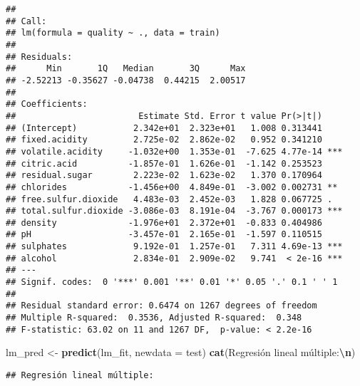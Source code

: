 \documentclass[
]{article}
\newenvironment{Shaded}{\begin{snugshade}}{\end{snugshade}}
\newcommand{\AttributeTok}[1]{\textcolor[rgb]{0.13,0.29,0.53}{#1}}
\newcommand{\DecValTok}[1]{\textcolor[rgb]{0.00,0.00,0.81}{#1}}
\newcommand{\FunctionTok}[1]{\textcolor[rgb]{0.13,0.29,0.53}{\textbf{#1}}}
\newcommand{\NormalTok}[1]{#1}
\newcommand{\OtherTok}[1]{\textcolor[rgb]{0.56,0.35,0.01}{#1}}
\newcommand{\SpecialCharTok}[1]{\textcolor[rgb]{0.81,0.36,0.00}{\textbf{#1}}}
\newcommand{\StringTok}[1]{\textcolor[rgb]{0.31,0.60,0.02}{#1}}
\begin{document}
\begin{verbatim}
## 
## Call:
## lm(formula = quality ~ ., data = train)
## 
## Residuals:
##      Min       1Q   Median       3Q      Max 
## -2.52213 -0.35627 -0.04738  0.44215  2.00517 
## 
## Coefficients:
##                        Estimate Std. Error t value Pr(>|t|)    
## (Intercept)           2.342e+01  2.323e+01   1.008 0.313441    
## fixed.acidity         2.725e-02  2.862e-02   0.952 0.341210    
## volatile.acidity     -1.032e+00  1.353e-01  -7.625 4.77e-14 ***
## citric.acid          -1.857e-01  1.626e-01  -1.142 0.253523    
## residual.sugar        2.223e-02  1.623e-02   1.370 0.170964    
## chlorides            -1.456e+00  4.849e-01  -3.002 0.002731 ** 
## free.sulfur.dioxide   4.483e-03  2.452e-03   1.828 0.067725 .  
## total.sulfur.dioxide -3.086e-03  8.191e-04  -3.767 0.000173 ***
## density              -1.976e+01  2.372e+01  -0.833 0.404986    
## pH                   -3.457e-01  2.165e-01  -1.597 0.110515    
## sulphates             9.192e-01  1.257e-01   7.311 4.69e-13 ***
## alcohol               2.834e-01  2.909e-02   9.741  < 2e-16 ***
## ---
## Signif. codes:  0 '***' 0.001 '**' 0.01 '*' 0.05 '.' 0.1 ' ' 1
## 
## Residual standard error: 0.6474 on 1267 degrees of freedom
## Multiple R-squared:  0.3536, Adjusted R-squared:  0.348 
## F-statistic: 63.02 on 11 and 1267 DF,  p-value: < 2.2e-16
\end{verbatim}

\begin{Shaded}
\begin{Highlighting}[]
\NormalTok{lm\_pred }\OtherTok{\textless{}{-}} \FunctionTok{predict}\NormalTok{(lm\_fit, }\AttributeTok{newdata =}\NormalTok{ test)}
\FunctionTok{cat}\NormalTok{(}\StringTok{\textquotesingle{}Regresión lineal múltiple:}\SpecialCharTok{\textbackslash{}n}\StringTok{\textquotesingle{}}\NormalTok{)}
\end{Highlighting}
\end{Shaded}

\begin{verbatim}
## Regresión lineal múltiple:
\end{verbatim}

\begin{Shaded}
\end{Shaded}
\end{document}
